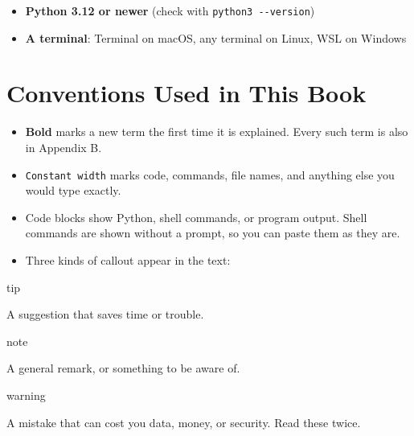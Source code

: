 \begin{itemize}
\tightlist
\item
  \textbf{Python 3.12 or newer} (check with \texttt{python3\ -\/-version})
\item
  \textbf{A terminal}: Terminal on macOS, any terminal on Linux, WSL on Windows
\end{itemize}

\section{Conventions Used in This Book}\label{00-preface:conventions-used-in-this-book}

\begin{itemize}
\tightlist
\item
  \textbf{Bold} marks a new term the first time it is explained. Every such term is also in Appendix B.
\item
  \texttt{Constant\ width} marks code, commands, file names, and anything else you would type exactly.
\item
  Code blocks show Python, shell commands, or program output. Shell commands are shown without a prompt, so you can paste them as they are.
\item
  Three kinds of callout appear in the text:
\end{itemize}

\begin{callout}{tip}

A suggestion that saves time or trouble.

\end{callout}

\begin{callout}{note}

A general remark, or something to be aware of.

\end{callout}

\begin{callout}{warning}

A mistake that can cost you data, money, or security. Read these twice.

\end{callout}
